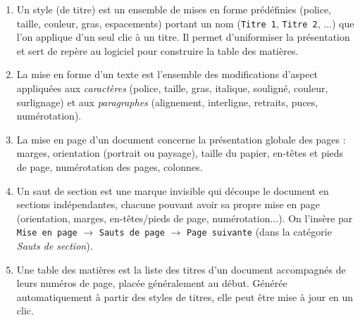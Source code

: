 \documentclass[11pt]{article}
\newcommand{\cle}[1]{{\popxbold\color{popdark}#1}}
\begin{document}
\begin{corrige}
\begin{enumerate}
\item Un \cle{style} (de titre) est un ensemble de mises en forme prédéfinies (police, taille, couleur, gras, espacements) portant un nom (\texttt{Titre 1}, \texttt{Titre 2}, ...) que l'on applique d'un seul clic à un titre. Il permet d'uniformiser la présentation et sert de repère au logiciel pour construire la table des matières.
\item La \cle{mise en forme} d'un texte est l'ensemble des modifications d'aspect appliquées aux \emph{caractères} (police, taille, gras, italique, souligné, couleur, surlignage) et aux \emph{paragraphes} (alignement, interligne, retraits, puces, numérotation).
\item La \cle{mise en page} d'un document concerne la présentation globale des pages : marges, orientation (portrait ou paysage), taille du papier, en-têtes et pieds de page, numérotation des pages, colonnes.
\item Un \cle{saut de section} est une marque invisible qui découpe le document en sections indépendantes, chacune pouvant avoir sa propre mise en page (orientation, marges, en-têtes/pieds de page, numérotation...). On l'insère par \texttt{Mise en page} $\to$ \texttt{Sauts de page} $\to$ \texttt{Page suivante} (dans la catégorie \emph{Sauts de section}).
\item Une \cle{table des matières} est la liste des titres d'un document accompagnés de leurs numéros de page, placée généralement au début. Générée automatiquement à partir des styles de titres, elle peut être mise à jour en un clic.
\end{enumerate}
\end{corrige}
\end{document}
